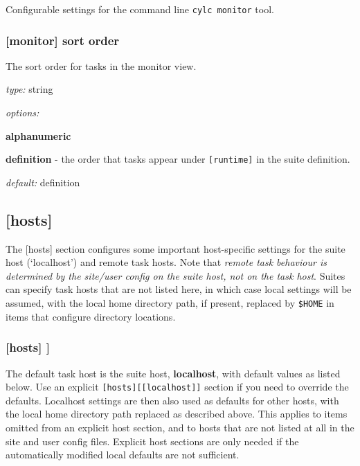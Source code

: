 Configurable settings for the command line \lstinline=cylc monitor= tool.

\subsubsection[monitor]{[monitor] \textrightarrow sort order}

The sort order for tasks in the monitor view.
\begin{myitemize}
\item {\em type:} string
\item {\em options:}
    \begin{myitemize}
    \item {\bf alphanumeric}
    \item {\bf definition} -  the order that tasks appear under
	    \lstinline=[runtime]= in the suite definition.
  \end{myitemize}
\item {\em default:} definition
\end{myitemize}

\subsection{[hosts]}

The [hosts] section configures some important host-specific settings for
the suite host (`localhost') and remote task hosts. Note that {\em
remote task behaviour is determined by the site/user config on the
suite host, not on the task host}. Suites can specify task hosts that
are not listed here, in which case local settings will be assumed,
with the local home directory path, if present, replaced by
\lstinline=$HOME= in items that configure directory locations.

\subsubsection[{[[}HOST{]]}]{[hosts] \textrightarrow [[HOST]]}

The default task host is the suite host, {\bf localhost}, with default
values as listed below. Use an explicit \lstinline=[hosts][[localhost]]=
section if you need to override the defaults. Localhost settings are
then also used as defaults for other hosts, with the local home
directory path replaced as described above. This applies to items
omitted from an explicit host section, and to hosts that are not listed
at all in the site and user config files.  Explicit host sections are only
needed if the automatically modified local defaults are not sufficient.

